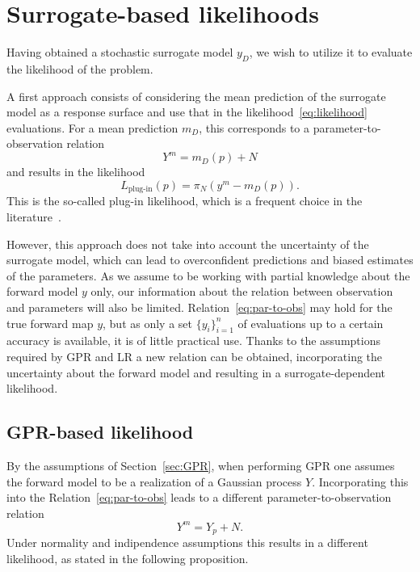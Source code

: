 \section{Surrogate-based likelihoods}\label{sec:likelihoods}
Having obtained a stochastic surrogate model $y_D$, we wish to utilize it to evaluate the likelihood of the problem.

A first approach consists of considering the mean prediction of the surrogate model as a response surface and use that in the likelihood~\eqref{eq:likelihood} evaluations. 
For a mean prediction $m_D$, this corresponds to a parameter-to-observation relation 
\begin{equation}\label{eq:plug-in-par-to-obs}
    Y^m = m_D(p) + N
\end{equation}
and results in the likelihood
\begin{equation}\label{eq:plug-in-likelihood}
    L_{\text{plug-in}}(p) = \pi_N(y^m - m_D(p)).
\end{equation}
This is the so-called plug-in likelihood, which is a frequent choice in the literature~\cite{SinsbeckNowak2017}. 

However, this approach does not take into account the uncertainty of the surrogate model, which can lead to overconfident predictions and biased estimates of the parameters.
As we assume to be working with partial knowledge about the forward model $y$ only, our information about the relation between observation and parameters will also be limited. 
Relation~\eqref{eq:par-to-obs} may hold for the true forward map $y$, but as only a set $\{y_i\}_{i=1}^n$ of evaluations up to a certain accuracy is available, it is of little practical use. 
Thanks to the assumptions required by GPR and LR a new relation can be obtained, incorporating the uncertainty about the forward model and resulting in a surrogate-dependent likelihood. 

\subsection{GPR-based likelihood}\label{sec:GPlike}
By the assumptions of Section~\ref{sec:GPR}, when performing GPR one assumes the forward model to be a realization of a Gaussian process $Y$.
Incorporating this into the Relation~\eqref{eq:par-to-obs} leads to a different parameter-to-observation relation
\begin{equation}\label{eq:GPR-par-to-obs}
    Y^m = Y_p + N.
\end{equation}
Under normality and indipendence assumptions this results in a different likelihood, as stated in the following proposition.

